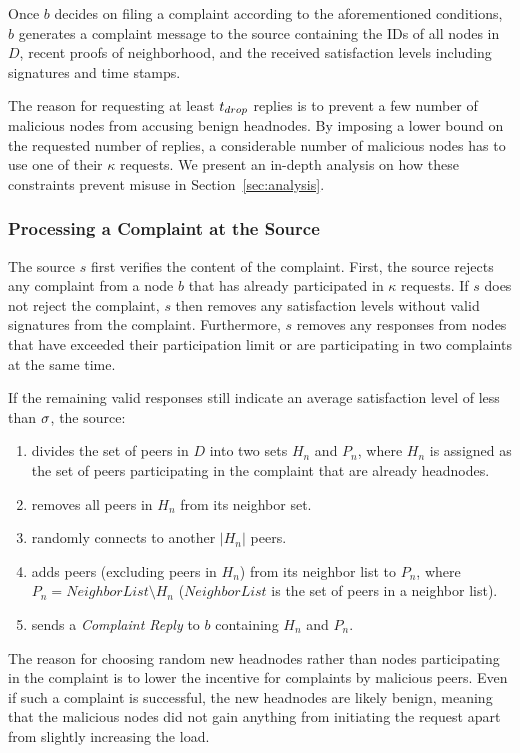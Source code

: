 Once $b$ decides on filing a complaint according to the aforementioned conditions, $b$ generates a complaint message to the source containing the IDs of all nodes in $D$, recent proofs of neighborhood,  and the received satisfaction levels including signatures and time stamps.  


The reason for requesting at least $t_{drop}$ replies is to prevent a few number of malicious nodes from accusing benign headnodes. By imposing a lower bound on the requested number of replies, a considerable number of malicious nodes has to use one of their $\kappa$ requests. We present an in-depth analysis on how these constraints prevent misuse in Section~\ref{sec:analysis}. 





\subsubsection*{Processing a Complaint at the Source}

The source $s$ first verifies the content of the complaint. First, the source rejects any complaint from a node $b$ that has already participated in $\kappa$ requests. 
If $s$ does not reject the complaint, $s$ then removes any satisfaction levels without valid signatures from the complaint.
Furthermore, $s$ removes any responses from nodes that have exceeded their participation limit or are participating in two complaints at the same time. 

If the remaining valid responses still indicate an average satisfaction level of less than $\sigma$, the source:  
\begin{enumerate}
 \item divides the set of peers in $D$ into two sets $H_n$ and $P_n$, where $H_n$ is assigned as the set of peers participating in the complaint that are already headnodes. 
 \item removes all peers in $H_n$ from its neighbor set.
 \item randomly connects to another $|H_n|$ peers. 
 \item adds peers (excluding peers in $H_n$) from its neighbor list to $P_n$, where $P_n = NeighborList\setminus H_n$ ($NeighborList$ is the set of peers in a neighbor list). 
 \item sends a \textit{Complaint Reply} to $b$ containing $H_n$ and $P_n$.
\end{enumerate}
 The reason for choosing random new headnodes rather than nodes participating in the complaint is to lower the incentive for complaints by malicious peers. Even if such a complaint is successful, the new headnodes are likely benign, meaning that the malicious nodes did not gain anything from initiating the request apart from slightly increasing the load. 


